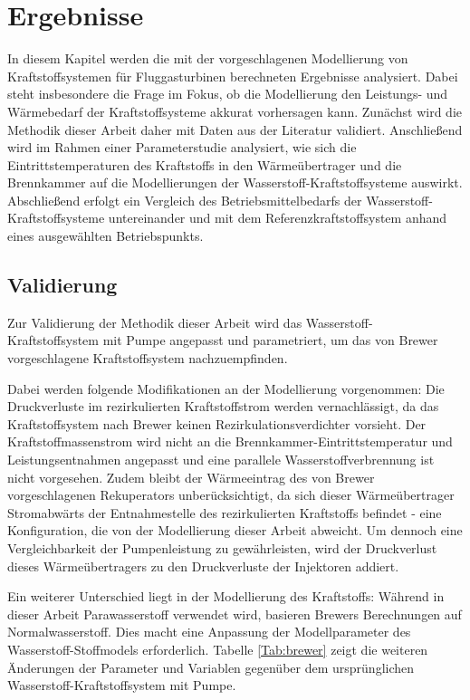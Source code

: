 \chapter{Ergebnisse} \label{chap:ergebnis}

In diesem Kapitel werden die mit der vorgeschlagenen Modellierung von Kraftstoffsystemen für Fluggasturbinen berechneten Ergebnisse analysiert. Dabei steht insbesondere die Frage im Fokus, ob die Modellierung den Leistungs- und Wärmebedarf der Kraftstoffsysteme akkurat vorhersagen kann. Zunächst wird die Methodik dieser Arbeit daher mit Daten aus der Literatur validiert. Anschließend wird im Rahmen einer Parameterstudie analysiert, wie sich die Eintrittstemperaturen des Kraftstoffs in den Wärmeübertrager und die Brennkammer auf die Modellierungen der Wasserstoff-Kraftstoffsysteme auswirkt. Abschließend erfolgt ein Vergleich des Betriebsmittelbedarfs der Wasserstoff-Kraftstoffsysteme untereinander und mit dem Referenzkraftstoffsystem anhand eines ausgewählten Betriebspunkts.

\section{Validierung}

Zur Validierung der Methodik dieser Arbeit wird das Wasserstoff-Kraftstoffsystem mit Pumpe angepasst und parametriert, um das von Brewer \cite{Brewer.1991} vorgeschlagene Kraftstoffsystem nachzuempfinden. 

Dabei werden folgende Modifikationen an der Modellierung vorgenommen: Die Druckverluste im rezirkulierten Kraftstoffstrom werden vernachlässigt, da das Kraftstoffsystem nach Brewer keinen Rezirkulationsverdichter vorsieht. Der Kraftstoffmassenstrom wird nicht an die Brennkammer-Eintrittstemperatur und Leistungsentnahmen angepasst und eine parallele Wasserstoffverbrennung ist nicht vorgesehen. Zudem bleibt der Wärmeeintrag des von Brewer vorgeschlagenen Rekuperators unberücksichtigt, da sich dieser Wärmeübertrager Stromabwärts der Entnahmestelle des rezirkulierten Kraftstoffs befindet - eine Konfiguration, die von der Modellierung dieser Arbeit abweicht. Um dennoch eine Vergleichbarkeit der Pumpenleistung zu gewährleisten, wird der Druckverlust dieses Wärmeübertragers zu den Druckverluste der Injektoren addiert. 

Ein weiterer Unterschied liegt in der Modellierung des Kraftstoffs: Während in dieser Arbeit Parawasserstoff verwendet wird, basieren Brewers Berechnungen auf Normalwasserstoff. Dies macht eine Anpassung der Modellparameter des Wasserstoff-Stoffmodels erforderlich. Tabelle \ref{Tab:brewer} zeigt die weiteren Änderungen der Parameter und Variablen gegenüber dem ursprünglichen Wasserstoff-Kraftstoffsystem mit Pumpe.

